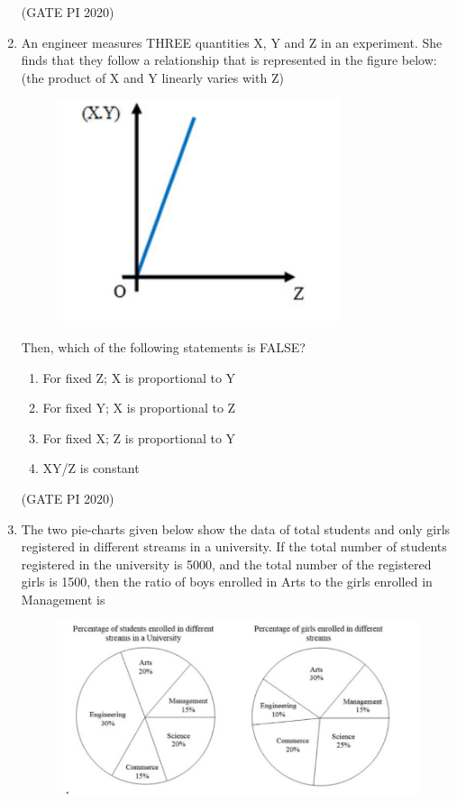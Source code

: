 \documentclass[journal,12pt,onecolumn]{IEEEtran}
\theoremstyle{remark}
\begin{document}
\begin{enumerate}
\hfill (GATE PI 2020)

\item An engineer measures THREE quantities X, Y and Z in an experiment. She finds that they follow a relationship that is represented in the figure below: (the product of X and Y linearly varies with Z)
\newpage

\begin{figure}[h]
    \centering
    \includegraphics[width=0.5\columnwidth]{figs/fig3.png}
    \caption{}
    \label{fig:placeholder}
\end{figure} 


Then, which of the following statements is FALSE?
\begin{enumerate}
    \item For fixed Z; X is proportional to Y
    \item For fixed Y; X is proportional to Z
    \item For fixed X; Z is proportional to Y
    \item XY/Z is constant
\end{enumerate}

\hfill (GATE PI 2020)

\item The two pie-charts given below show the data of total students and only girls registered in different streams in a university. If the total number of students registered in the university is 5000, and the total number of the registered girls is 1500, then the ratio of boys enrolled in Arts to the girls enrolled in Management is

\begin{figure}[h]
    \centering
    \includegraphics[width=0.5\columnwidth]{figs/fig4.png}
    \caption{}
    \label{fig:placeholder}
\end{figure}


\end{enumerate}
\end{document}

